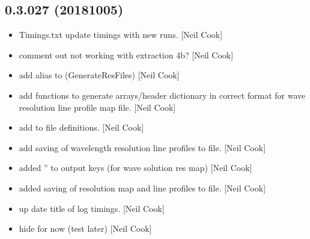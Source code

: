 \documentclass[a4paper,10pt,english]{report}
\begin{document}
\subsection{0.3.027 (2018\sphinxhyphen{}10\sphinxhyphen{}05)}
\label{\detokenize{misc/changelog:id323}}\begin{itemize}
\item {} 
Timings.txt \sphinxhyphen{} update timings with new runs. {[}Neil Cook{]}

\item {} 
 \sphinxhyphen{} comment out  \sphinxhyphen{} not working with
extraction 4b? {[}Neil Cook{]}

\item {} 
 \sphinxhyphen{} add alias to 
(GenerateResFiles) {[}Neil Cook{]}

\item {} 
 \sphinxhyphen{} add  functions to generate
arrays/header dictionary in correct format for wave resolution line
profile map file. {[}Neil Cook{]}

\item {} 
 \sphinxhyphen{} add  to file definitions. {[}Neil Cook{]}

\item {} 
 \sphinxhyphen{} add saving of wavelength resolution line
profiles to file. {[}Neil Cook{]}

\item {} 
 \sphinxhyphen{} added ” to output keys (for wave solution
res map) {[}Neil Cook{]}

\item {} 
 \sphinxhyphen{} added saving of resolution map and line
profiles to file. {[}Neil Cook{]}

\item {} 
 \sphinxhyphen{} up date title of log timings. {[}Neil Cook{]}

\item {} 
 \sphinxhyphen{} hide   for now (test later) {[}Neil
Cook{]}


\end{itemize}
\end{document}
